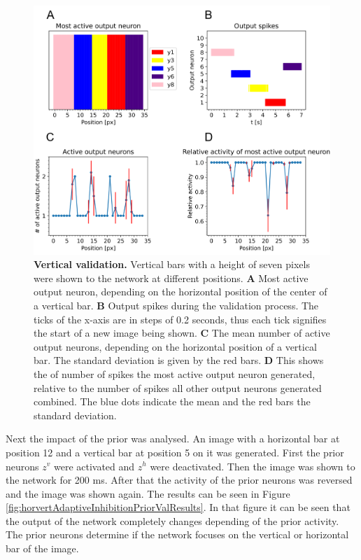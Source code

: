 \begin{figure}
  \includegraphics[width=\linewidth]{figures/horvertAdaptiveInh/vertical_validation.png}
  \caption{\textbf{Vertical validation.} Vertical bars with a height of seven pixels were shown to the network at different positions. \textbf{A} Most active output neuron, depending on the horizontal position of the center of a vertical bar. \textbf{B} Output spikes during the validation process. The ticks of the x-axis are in steps of 0.2 seconds, thus each tick signifies the start of a new image being shown. \textbf{C} The mean number of active output neurons, depending on the horizontal position of a vertical bar. The standard deviation is given by the red bars. \textbf{D} This shows the of number of spikes the most active output neuron generated, relative to the number of spikes all other output neurons generated combined. The blue dots indicate the mean and the red bars the standard deviation. }
  \label{fig:horvertAdaptiveInhibitionVerticalValResults}
\end{figure}

Next the impact of the prior was analysed. An image with a horizontal bar at position 12 and a vertical bar at position 5 on it was generated. First the prior neurons $z^v$ were activated and $z^h$ were deactivated. Then the image was shown to the network for 200 ms. After that the activity of the prior neurons was reversed and the image was shown again. The results can be seen in Figure \ref{fig:horvertAdaptiveInhibitionPriorValResults}. In that figure it can be seen that the output of the network completely changes depending of the prior activity. The prior neurons determine if the network focuses on the vertical or horizontal bar of the image.

